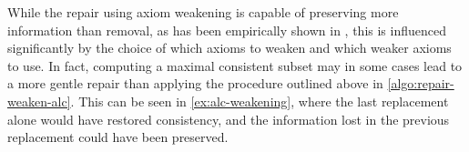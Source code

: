While the repair using axiom weakening is capable of preserving more information than removal, as has been empirically shown in \cite{troquard2018repairing}, this is influenced significantly by the choice of which axioms to weaken and which weaker axioms to use. In fact, computing a maximal consistent subset may in some cases lead to a more gentle repair than applying the procedure outlined above in \cref{algo:repair-weaken-alc}. This can be seen in \cref{ex:alc-weakening}, where the last replacement alone would have restored consistency, and the information lost in the previous replacement could have been preserved.
